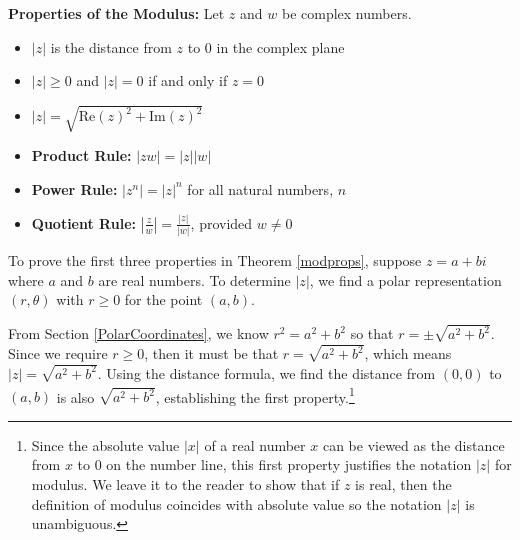 \documentclass{ximera}
\begin{document}
\begin{theorem} \label{modprops} \textbf{Properties of the Modulus:}  Let $z$ and $w$ be complex numbers.  

\begin{itemize}

\item  $|z|$ is the distance from $z$ to $0$ in the complex plane

\item  $|z| \geq 0$ and $|z| = 0$ if and only if $z=0$

\item  $|z| = \sqrt{\text{Re}(z)^2 + \text{Im}(z)^2}$

\item  \textbf{Product Rule:}  $|zw| = |z||w|$ 

\item  \textbf{Power Rule:}  $\left|z^{n}\right| = |z|^{n}$ for all natural numbers, $n$ 

\item  \textbf{Quotient Rule:}  $\left| \frac{z}{w} \right| = \frac{|z|}{|w|}$, provided $w \neq 0$ 

\end{itemize}

\end{theorem}


 

To prove the first three properties in Theorem \ref{modprops}, suppose $z = a + bi$ where $a$ and $b$ are real numbers.  To determine $|z|$, we find a polar representation $(r,\theta)$ with $r \geq 0$ for the point $(a,b)$.  

 

From Section \ref{PolarCoordinates}, we know $r^2 = a^2 + b^2$ so that $r = \pm \sqrt{a^2+b^2}$.  Since we require $r \geq 0$, then it must be that $r = \sqrt{a^2 +b^2}$, which means $|z| = \sqrt{a^2+b^2}$.  Using the distance formula, we find the distance from $(0,0)$ to $(a,b)$ is also $\sqrt{a^2+b^2}$, establishing the first property.\footnote{Since the absolute value $|x|$ of a real number $x$ can be viewed as the distance from $x$ to $0$ on the number line, this first property justifies the notation $|z|$ for modulus.  We leave it to the reader to show that if $z$ is real, then the definition of modulus coincides with absolute value so the notation $|z|$ is unambiguous.}  
\end{document}
